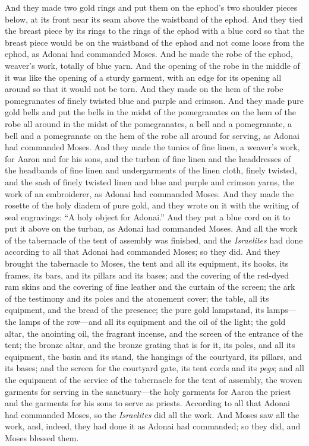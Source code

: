 \begin{biblechapter}
\verse And they made two gold rings and put them on the ephod’s two shoulder pieces below, at its front near its seam above the waistband of the ephod.
\verse And they tied the breast piece by its rings to the rings of the ephod with a blue cord so that the breast piece would be on the waistband of the ephod and not come loose from the ephod, as Adonai had commanded Moses.
\verse And he made the robe of the ephod, weaver’s work, totally of blue yarn.
\verse And the opening of the robe in the middle of it was like the opening of a sturdy garment, with an edge for its opening all around so that it would not be torn.
\verse And they made on the hem of the robe pomegranates of finely twisted blue and purple and crimson.
\verse And they made pure gold bells and put the bells in the midst of the pomegranates on the hem of the robe all around in the midst of the pomegranates,
\verse a bell and a pomegranate, a bell and a pomegranate on the hem of the robe all around for serving, as Adonai had commanded Moses.
\verse And they made the tunics of fine linen, a weaver’s work, for Aaron and for his sons,
\verse and the turban of fine linen and the headdresses of the headbands of fine linen and undergarments of the linen cloth, finely twisted,
\verse and the sash of finely twisted linen and blue and purple and crimson yarns, the work of an embroiderer, as Adonai had commanded Moses.
\verse And they made the rosette of the holy diadem of pure gold, and they wrote on it with the writing of seal engravings: “A holy object for Adonai.”
\verse And they put a blue cord on it to put it above on the turban, as Adonai had commanded Moses.
 And all the work of the tabernacle of the tent of assembly was finished, and the \textit{Israelites} had done according to all that Adonai had commanded Moses; so they did.
\verse And they brought the tabernacle to Moses, the tent and all its equipment, its hooks, its frames, its bars, and its pillars and its bases;
\verse and the covering of the red-dyed ram skins and the covering of fine leather and the curtain of the screen;
\verse the ark of the testimony and its poles and the atonement cover;
\verse the table, all its equipment, and the bread of the presence;
\verse the pure gold lampstand, its lamps—the lamps of the row—and all its equipment and the oil of the light;
\verse the gold altar, the anointing oil, the fragrant incense, and the screen of the entrance of the tent;
\verse the bronze altar, and the bronze grating that is for it, its poles, and all its equipment, the basin and its stand,
\verse the hangings of the courtyard, its pillars, and its bases; and the screen for the courtyard gate, its tent cords and its \textit{pegs}; and all the equipment of the service of the tabernacle for the tent of assembly,
\verse the woven garments for serving in the sanctuary—the holy garments for Aaron the priest and the garments for his sons to serve as priests.
\verse According to all that Adonai had commanded Moses, so the \textit{Israelites} did all the work.
\verse And Moses saw all the work, and, indeed, they had done it as Adonai had commanded; so they did, and Moses blessed them.
\end{biblechapter}

